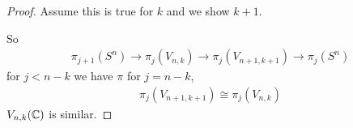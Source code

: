 \documentclass[12pt,class=article,crop=false]{standalone}
\begin{document}
\begin{proof}
Assume this is true for  $ k$ and we show  $ k+1$.

So
\begin{align*}
	\pi_{j+1}(S^{n}) \to \pi_j(V_{n,k}) \to \pi_j(V_{n+1,k+1}) \to \pi_j(S^{n})
\end{align*}
for $ j<n-k$ we have  $ \pi$
for $ j=n-k$,
 \begin{align*}
 	\pi_j(V_{n+1,k+1}) \cong \pi_j(V_{n,k})
 \end{align*}
 $ V_{n,k}( \mathbb{C})$ is similar.
\end{proof}
\end{document}
